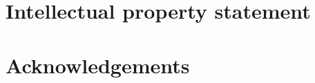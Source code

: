 \uomtoc

\begin{abstract}
\end{abstract}

\begin{uomoriginality}
\end{uomoriginality}
{}
\section*{Intellectual property statement}

{}
\section*{Acknowledgements}
\clearpage

